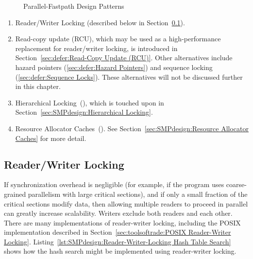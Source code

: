 \begin{figure}[tbp]
\centering
{}
\caption{Parallel-Fastpath Design Patterns}
\label{fig:SMPdesign:Parallel-Fastpath Design Patterns}
\end{figure}

\begin{enumerate}
\item	Reader/Writer Locking
	(described below in Section~\ref{sec:SMPdesign:Reader/Writer Locking}).
\item	Read-copy update (RCU), which may be used as a high-performance
	replacement for reader/writer locking, is introduced in
	Section~\ref{sec:defer:Read-Copy Update (RCU)}.
	Other alternatives include hazard pointers
	(\cref{sec:defer:Hazard Pointers})
	and sequence locking (\cref{sec:defer:Sequence Locks}).
	These alternatives will not be discussed further in this chapter.
\item   Hierarchical Locking~(\cite{McKenney95b}), which is touched upon
	in Section~\ref{sec:SMPdesign:Hierarchical Locking}.
\item	Resource Allocator Caches~(\cite{McKenney95b,McKenney93}).
	See Section~\ref{sec:SMPdesign:Resource Allocator Caches}
	for more detail.
\end{enumerate}

\subsection{Reader/Writer Locking}
\label{sec:SMPdesign:Reader/Writer Locking}

If synchronization overhead is negligible (for example, if the program
uses coarse-grained parallelism with large critical sections), and if
only a small fraction of the critical sections modify data, then allowing
multiple readers to proceed in parallel can greatly increase scalability.
Writers exclude both readers and each other.
There are many implementations of reader-writer locking, including
the POSIX implementation described in
Section~\ref{sec:toolsoftrade:POSIX Reader-Writer Locking}.
Listing~\ref{lst:SMPdesign:Reader-Writer-Locking Hash Table Search}
shows how the hash search might be implemented using reader-writer locking.

